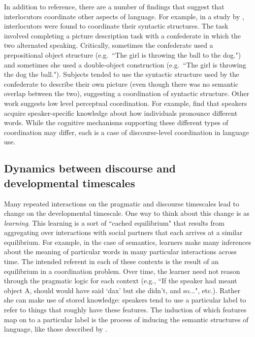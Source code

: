 \documentclass[man, noapacite, 12pt]{apa2}
\begin{document}
In addition to reference, there are a number of findings that suggest that interlocutors coordinate other aspects of language.  For example, in a study by , interlocutors were found to coordinate their syntactic structures. The task involved completing a picture description task with a confederate in which the two alternated speaking. Critically,  sometimes the confederate used a prepositional object structure (e.g.\ ``The girl is throwing the ball to the dog.") and sometimes she used a double-object construction (e.g.\ ``The girl is throwing the dog the ball.").  Subjects tended to use the syntactic structure used by the confederate to describe their own picture (even though there was no semantic overlap between the two), suggesting a coordination of syntactic structure. Other work suggests low level perceptual coordination. For example,   find that speakers acquire speaker-specific knowledge about how individuals pronounce different words. While the cognitive mechanisms supporting these different types of coordination may differ,  each is a case of discourse-level coordination in language use. 

\subsection{Dynamics between discourse and developmental timescales} 
Many repeated interactions on the pragmatic and discourse timescales lead to change on the developmental timescale. One way to think about this change is as {\it learning}. This learning is a sort of ``cached equilibrium" that results from aggregating over interactions with social partners that each arrives at a similar equilibrium. For example, in the case of semantics, learners make many inferences about the meaning of particular words in many particular interactions across time. The intended referent in each of these contexts is the result of an equilibrium in a coordination problem. Over time, the learner need not reason through the pragmatic logic for each context (e.g., ``If the speaker had meant object A, should would have said `dax' but she didn't, and so...", etc.). Rather she can make use of stored knowledge: speakers tend to use a particular label to refer to things that roughly have these features. The induction of which features map on to a particular label is the process of inducing the semantic structures of language, like those described by .
\end{document}
